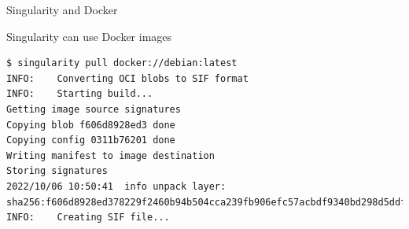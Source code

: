 \begin{frame}[<+->][fragile]{Singularity and Docker}
\begin{block}{Singularity can use Docker images}
\begin{verbatim}
$ singularity pull docker://debian:latest
INFO:    Converting OCI blobs to SIF format
INFO:    Starting build...
Getting image source signatures
Copying blob f606d8928ed3 done  
Copying config 0311b76201 done  
Writing manifest to image destination
Storing signatures
2022/10/06 10:50:41  info unpack layer: sha256:f606d8928ed378229f2460b94b504cca239fb906efc57acbdf9340bd298d5ddf
INFO:    Creating SIF file...
\end{verbatim}
\end{block}
\end{frame}
